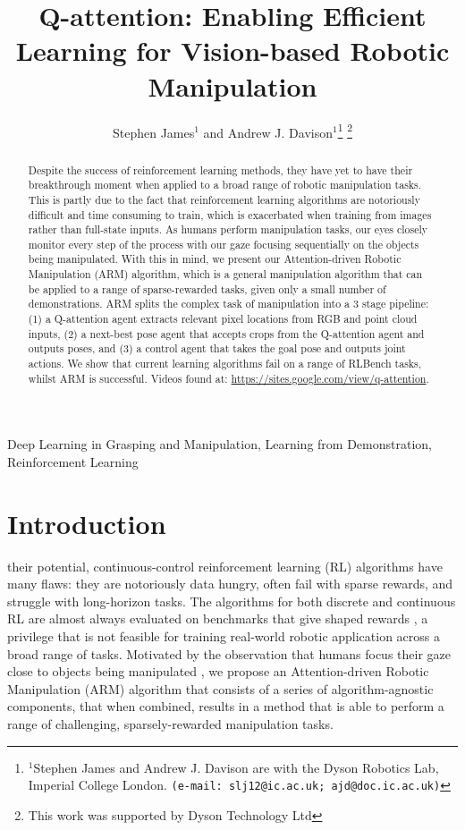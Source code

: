 \documentclass[letterpaper, 10 pt, journal, twoside]{IEEEtran}
\title{Q-attention: Enabling Efficient Learning for Vision-based Robotic Manipulation}
\author{Stephen James$^{1}$ and Andrew J. Davison$^{1}$\thanks{$^{1}$Stephen James and Andrew J. Davison are with the Dyson Robotics Lab, Imperial College London. {\tt\footnotesize(e-mail: slj12@ic.ac.uk; ajd@doc.ic.ac.uk)}}
\thanks{This work was supported by Dyson Technology Ltd}
}
\begin{document}
\maketitle

\begin{abstract}
Despite the success of reinforcement learning methods, they have yet to have their breakthrough moment when applied to a broad range of robotic manipulation tasks. This is partly due to the fact that reinforcement learning algorithms are notoriously difficult and time consuming to train, which is exacerbated when training from images rather than full-state inputs. As humans perform manipulation tasks, our eyes closely monitor every step of the process with our gaze focusing sequentially on the objects being manipulated. With this in mind, we present our Attention-driven Robotic Manipulation (ARM) algorithm, which is a general manipulation algorithm that can be applied to a range of sparse-rewarded tasks, given only a small number of demonstrations. ARM splits the complex task of manipulation into a 3 stage pipeline: (1) a Q-attention agent extracts relevant pixel locations from RGB and point cloud inputs, (2) a next-best pose agent that accepts crops from the Q-attention agent and outputs poses, and (3) a control agent that takes the goal pose and outputs joint actions. We show that current learning algorithms fail on a range of RLBench tasks, whilst ARM is successful. Videos found at: \url{https://sites.google.com/view/q-attention}.
\end{abstract}

\begin{IEEEkeywords}
Deep Learning in Grasping and Manipulation, Learning from Demonstration, Reinforcement Learning
\end{IEEEkeywords}

\section{Introduction}

 their potential, continuous-control reinforcement learning (RL) algorithms have many flaws: they are notoriously data hungry, often fail with sparse rewards, and struggle with long-horizon tasks. The algorithms for both discrete and continuous RL are almost always evaluated on benchmarks that give shaped rewards \cite{brockman2016openai, tassa2018deepmind}, a privilege that is not feasible for training real-world robotic application across a broad range of tasks. Motivated by the observation that humans focus their gaze close to objects being manipulated \cite{land1999roles}, we propose an Attention-driven Robotic Manipulation (ARM) algorithm that consists of a series of algorithm-agnostic components, that when combined, results in a method that is able to perform a range of challenging, sparsely-rewarded manipulation tasks. 
\end{document}
